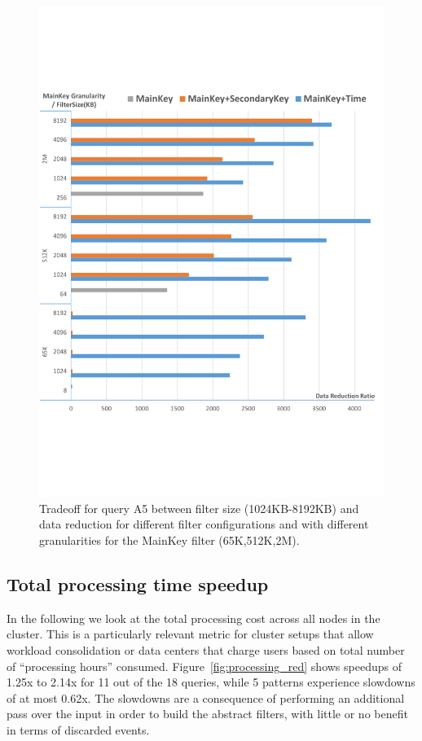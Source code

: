 \begin{figure}[tp]
	\centering
	
	\includegraphics[clip, trim=0cm 3.5cm 0.3cm 3.7cm,
	width=\columnwidth]{graphs_A5_tradeoff.pdf}
	\caption{Tradeoff for query A5 between filter size (1024KB-8192KB) and data
		reduction for different filter configurations and with different 
		granularities
		for the MainKey filter (65K,512K,2M).}
	\label{fig:tradeoff}
\end{figure}

\subsection{Total processing time speedup}

In the following we look at the total processing cost across all nodes in the
cluster.
This is a particularly relevant metric for cluster setups that allow workload
consolidation or data centers that charge users based on total number of
``processing hours'' consumed.
Figure~\ref{fig:processing_red} shows speedups of 1.25x to 2.14x for 11 out of
the 18 queries, while 5 patterns experience slowdowns of at most 0.62x.
The slowdowns are a consequence of performing an additional pass over the input
in order to build the abstract filters, with little or no benefit in terms of
discarded events.


